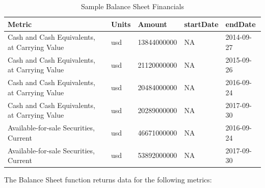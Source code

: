 \documentclass[]{book}
\theoremstyle{definition}
\theoremstyle{definition}
\theoremstyle{definition}
\theoremstyle{remark}
\begin{document}
\begin{table}[t]

\caption{\label{tab:unnamed-chunk-28}Sample Balance Sheet Financials}
\centering
\begin{tabular}{lllll}
\toprule
Metric & Units & Amount & startDate & endDate\\
\midrule
Cash and Cash Equivalents, at Carrying Value & usd & 13844000000 & NA & 2014-09-27\\
Cash and Cash Equivalents, at Carrying Value & usd & 21120000000 & NA & 2015-09-26\\
Cash and Cash Equivalents, at Carrying Value & usd & 20484000000 & NA & 2016-09-24\\
Cash and Cash Equivalents, at Carrying Value & usd & 20289000000 & NA & 2017-09-30\\
Available-for-sale Securities, Current & usd & 46671000000 & NA & 2016-09-24\\
\addlinespace
Available-for-sale Securities, Current & usd & 53892000000 & NA & 2017-09-30\\
\bottomrule
\end{tabular}
\end{table}

The Balance Sheet function returns data for the following metrics:
\end{document}

